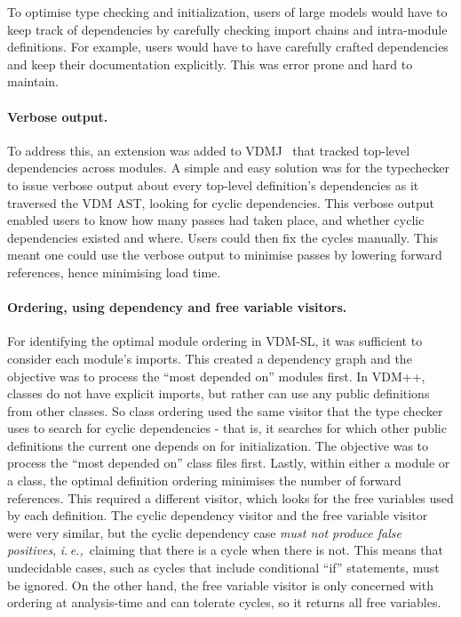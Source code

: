 \documentclass[runningheads,a4paper]{llncs}
\newcommand{\ie}{{\em i.\,e.,\/}}
\begin{document}
To optimise type checking and initialization, users of large models would have to keep track of dependencies by carefully checking import chains and intra-module definitions. For example, users would have to have carefully crafted dependencies and keep their documentation explicitly. This was error prone and hard to maintain. 

\paragraph*{Verbose output.}
%
To address this, an extension was added to VDMJ~\cite{Battle09} that tracked top-level dependencies across modules. A simple and easy solution was for the typechecker to issue verbose output about every top-level definition's dependencies as it traversed the VDM AST, looking for cyclic dependencies. This verbose output enabled users to know how many passes had taken place, and whether cyclic dependencies existed and where. Users could then fix the cycles manually. This meant one could use the verbose output to minimise passes by lowering forward references, hence minimising load time.   

\paragraph*{Ordering, using dependency and free variable visitors.}
%
For identifying the optimal module ordering in VDM-SL, it was sufficient to consider each module's imports. This created a dependency graph and the objective was to process the ``most depended on'' modules first. In VDM++, classes do not have explicit imports, but rather can use any public definitions from other classes. So class ordering used the same visitor that the type checker uses to search for cyclic dependencies - that is, it searches for which other public definitions the current one depends on for initialization. The objective was to process the ``most depended on'' class files first. Lastly, within either a module or a class, the optimal definition ordering minimises the number of forward references. This required a different visitor, which looks for the free variables used by each definition. The cyclic dependency visitor and the free variable visitor were very similar, but the cyclic dependency case \emph{must not produce false positives}, \ie~claiming that there is a cycle when there is not. This means that undecidable cases, such as cycles that include conditional ``if'' statements, must be ignored. On the other hand, the free variable visitor is only concerned with ordering at analysis-time and can tolerate cycles, so it returns all free variables.
\end{document}
